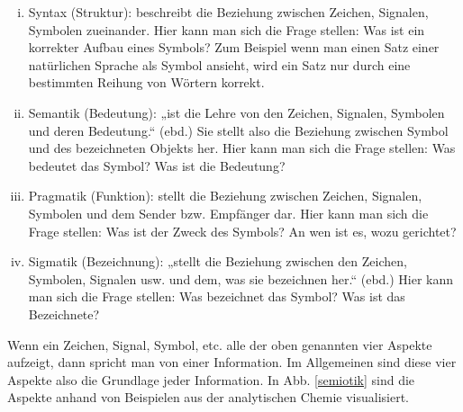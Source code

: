  
\begin{enumerate}[(i)]

\item
Syntax (Struktur): beschreibt die Beziehung zwischen Zeichen, Signalen, Symbolen zueinander. Hier kann man sich die Frage stellen: Was ist ein korrekter Aufbau eines Symbols? Zum Beispiel wenn man einen Satz einer natürlichen Sprache als Symbol ansieht, wird ein Satz nur durch eine bestimmten Reihung von Wörtern korrekt.


\item
Semantik (Bedeutung): „ist die Lehre von den Zeichen, Signalen, Symbolen und deren Bedeutung.“ (ebd.) Sie stellt also die Beziehung zwischen Symbol und des bezeichneten Objekts her. Hier kann man sich die Frage stellen: Was bedeutet das Symbol? Was ist die Bedeutung?


\item
Pragmatik (Funktion): stellt die Beziehung zwischen Zeichen, Signalen, Symbolen und dem Sender bzw. Empfänger dar. Hier kann man sich die Frage stellen: Was ist der Zweck des Symbols? An wen ist es, wozu gerichtet?


\item
Sigmatik (Bezeichnung): „stellt die Beziehung zwischen den Zeichen, Symbolen, Signalen usw. und dem, was sie bezeichnen her.“ (ebd.) Hier kann man sich die Frage stellen: Was bezeichnet das Symbol? Was ist das Bezeichnete?


\end{enumerate}
 
Wenn ein Zeichen, Signal, Symbol, etc. alle der oben genannten vier Aspekte aufzeigt, dann spricht man von einer Information. Im Allgemeinen sind diese vier Aspekte also die Grundlage jeder Information. In Abb. \ref{semiotik} sind die Aspekte anhand von Beispielen aus der analytischen Chemie visualisiert.

